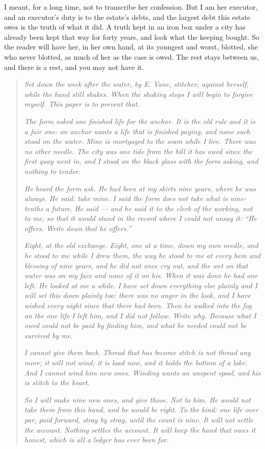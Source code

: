 I meant, for a long time, not to transcribe her confession. But I am her executor, and an executor's duty is to the estate's debts, and the largest debt this estate owes is the truth of what it did. A truth kept in an iron box under a city has already been kept that way for forty years, and look what the keeping bought. So the reader will have her, in her own hand, at its youngest and worst, blotted, she who never blotted, as much of her as the case is owed. The rest stays between us, and there is a rest, and you may not have it.

\begin{quote}
\emph{Set down the week after the water, by E. Vane, stitcher, against herself, while the hand still shakes. When the shaking stops I will begin to forgive myself. This paper is to prevent that.}

\emph{The form asked one finished life for the anchor. It is the old rule and it is a fair one: an anchor wants a life that is finished paying, and none such stood on the water. Mine is mortgaged to the seam while I live. There was no other needle. The city was one tide from the bill it has owed since the first quay went in, and I stood on the black glass with the form asking, and nothing to tender.}

\emph{He heard the form ask. He had been at my skirts nine years, where he was always. He said: take mine. I said the form does not take what is nine-tenths a future. He said --- and he said it to the clerk of the working, not to me, so that it would stand in the record where I could not unsay it: ``He offers. Write down that he offers.''}

\emph{Eight, at the old exchange. Eight, one at a time, down my own needle, and he stood to me while I drew them, the way he stood to me at every hem and blessing of nine years, and he did not once cry out, and the wet on that water was on my face and none of it on his. When it was done he had one left. He looked at me a while. I have set down everything else plainly and I will set this down plainly too: there was no anger in the look, and I have wished every night since that there had been. Then he walked into the fog on the one life I left him, and I did not follow. Write why. Because what I owed could not be paid by finding him, and what he needed could not be survived by me.}

\emph{I cannot give them back. Thread that has become stitch is not thread any more; it will not wind; it is load now, and it holds the bottom of a lake. And I cannot wind him new ones. Winding wants an unspent spool, and his is stitch to the heart.}

\emph{So I will make nine new ones, and give those. Not to him. He would not take them from this hand, and he would be right. To the kind: one life over par, paid forward, stray by stray, until the count is nine. It will not settle the account. Nothing settles the account. It will keep the hand that owes it honest, which is all a ledger has ever been for.}
\end{quote}

